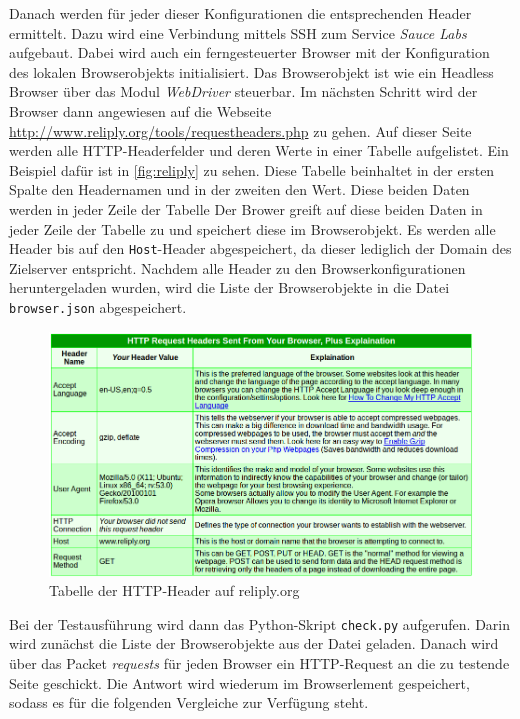 Danach werden für jeder dieser Konfigurationen die entsprechenden Header ermittelt.
Dazu wird eine Verbindung mittels \ac{SSH} zum Service \textit{Sauce Labs} aufgebaut.
Dabei wird auch ein ferngesteuerter Browser mit der Konfiguration des lokalen Browserobjekts initialisiert.
Das Browserobjekt ist wie ein Headless Browser über das Modul \textit{WebDriver} steuerbar.
Im nächsten Schritt wird der Browser dann angewiesen auf die Webseite \url{http://www.reliply.org/tools/requestheaders.php} zu gehen.
Auf dieser Seite werden alle \ac{HTTP}-Headerfelder und deren Werte in einer Tabelle aufgelistet.
Ein Beispiel dafür ist in \autoref{fig:reliply} zu sehen.
Diese Tabelle beinhaltet in der ersten Spalte den Headernamen und in der zweiten den Wert.
Diese beiden Daten werden in jeder Zeile der Tabelle 
Der Brower greift auf diese beiden Daten in jeder Zeile der Tabelle zu und speichert diese im Browserobjekt.
Es werden alle Header bis auf den \lstinline{Host}-Header abgespeichert, da dieser lediglich der Domain des Zielserver entspricht.
Nachdem alle Header zu den Browserkonfigurationen heruntergeladen wurden, wird die Liste der Browserobjekte in die Datei \lstinline{browser.json} abgespeichert.

\begin{figure}[H]
	\centering
	\includegraphics[width=\textwidth]{images/reliply.png}
	\caption{Tabelle der HTTP-Header auf reliply.org}
	\label{fig:reliply}
\end{figure}

Bei der Testausführung wird dann das Python-Skript \lstinline{check.py} aufgerufen.
Darin wird zunächst die Liste der Browserobjekte aus der Datei geladen.
Danach wird über das Packet \textit{requests} für jeden Browser ein \ac{HTTP}-Request an die zu testende Seite geschickt.
Die Antwort wird wiederum im Browserlement gespeichert, sodass es für die folgenden Vergleiche zur Verfügung steht.

